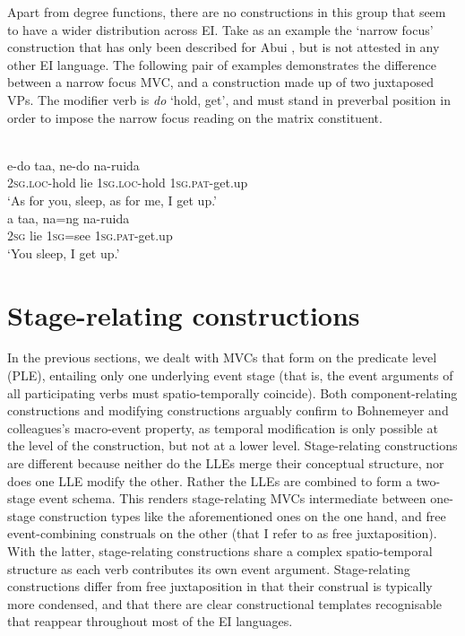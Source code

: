 Apart from degree functions, there are no constructions in this group that seem to have a wider distribution across EI. Take as an example the `narrow focus' construction that has only been described for Abui \citep[385f.]{kratochvil2007grammar}, but is not attested in any other EI language. The following pair of examples demonstrates the difference between a narrow focus MVC, and a construction made up of two juxtaposed VPs. The modifier verb is \textit{do} `hold, get', and must stand in preverbal position in order to impose the narrow focus reading on the matrix constituent.

\ea \label{Abui_99}
\\
\ea
\gll e-do taa, ne-do na-ruida \\
2\textsc{sg}.\textsc{loc}-hold lie 1\textsc{sg}.\textsc{loc}-hold 1\textsc{sg}.\textsc{pat}-get.up \\
\glft `As for you, sleep, as for me, I get up.’ \\ 
\ex
\gll a taa, na=ng na-ruida \\ 
2\textsc{sg} lie 1\textsc{sg}=see 1\textsc{sg}.\textsc{pat}-get.up \\
\glft `You sleep, I get up.’\\ 
\z
\z

\section{Stage-relating constructions}\label{sec:stage-relating}

In the previous sections, we dealt with MVCs that form on the predicate level (PLE), entailing only one underlying event stage (that is, the event arguments of all participating verbs must spatio-temporally coincide). Both component-relating constructions and modifying constructions arguably confirm to Bohnemeyer and colleagues's macro-event property, as temporal modification is only possible at the level of the construction, but not at a lower level. Stage-relating constructions are different because neither do the LLEs merge their conceptual structure, nor does one LLE modify the other. Rather the LLEs are combined to form a two-stage event schema. This renders stage-relating MVCs intermediate between one-stage construction types like the aforementioned ones on the one hand, and free event-combining construals on the other (that I refer to as free juxtaposition). With the latter, stage-relating constructions share a complex spatio-temporal structure as each verb contributes its own event argument. Stage-relating constructions differ from free juxtaposition in that their construal is typically more condensed, and that there are clear constructional templates recognisable that reappear throughout most of the EI languages.


